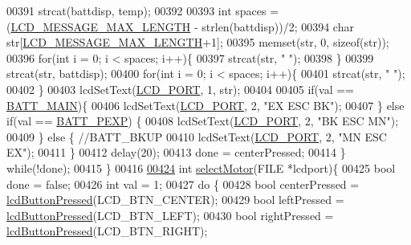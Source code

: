 \begin{DoxyCode}
{{00391         strcat(battdisp, temp);
00392 
00393         \textcolor{keywordtype}{int} spaces = (\hyperlink{lcdmsg_8h_abe4c4b70fc6f44ae3680e5b2c68cdd00}{LCD\_MESSAGE\_MAX\_LENGTH} - strlen(battdisp))/2;
00394         \textcolor{keywordtype}{char} str[\hyperlink{lcdmsg_8h_abe4c4b70fc6f44ae3680e5b2c68cdd00}{LCD\_MESSAGE\_MAX\_LENGTH}+1];
00395         memset(str, 0, \textcolor{keyword}{sizeof}(str));
00396         \textcolor{keywordflow}{for}(\textcolor{keywordtype}{int} i = 0; i < spaces; i++)\{
00397             strcat(str, \textcolor{stringliteral}{" "});
00398         \}
00399         strcat(str, battdisp);
00400         \textcolor{keywordflow}{for}(\textcolor{keywordtype}{int} i = 0; i < spaces; i++)\{
00401             strcat(str, \textcolor{stringliteral}{" "});
00402         \}
00403         lcdSetText(\hyperlink{lcdmsg_8h_abcf42bd88b3c36193f301ca25b033875}{LCD\_PORT}, 1, str);
00404 
00405         \textcolor{keywordflow}{if}(val == \hyperlink{sensors_8h_aa48831e4de90908c1b37560e7aba2c5f}{BATT\_MAIN})\{
00406             lcdSetText(\hyperlink{lcdmsg_8h_abcf42bd88b3c36193f301ca25b033875}{LCD\_PORT}, 2, \textcolor{stringliteral}{"EX     ESC    BK"});
00407         \} \textcolor{keywordflow}{else} \textcolor{keywordflow}{if}(val == \hyperlink{sensors_8h_aaad063d8cfbd393cdc04bcaae68b48ef}{BATT\_PEXP}) \{
00408             lcdSetText(\hyperlink{lcdmsg_8h_abcf42bd88b3c36193f301ca25b033875}{LCD\_PORT}, 2, \textcolor{stringliteral}{"BK     ESC    MN"});
00409         \} \textcolor{keywordflow}{else} \{ \textcolor{comment}{//BATT\_BKUP}
00410             lcdSetText(\hyperlink{lcdmsg_8h_abcf42bd88b3c36193f301ca25b033875}{LCD\_PORT}, 2, \textcolor{stringliteral}{"MN     ESC    EX"});
00411         \}
00412         delay(20);
00413         done = centerPressed;
00414     \} \textcolor{keywordflow}{while}(!done);
00415 \}
00416 
\hypertarget{lcddiag_8c_source.tex_l00424}{}\hyperlink{lcddiag_8c_ae7425e4ec1454bd0054bd4e1db7ea686}{00424} \textcolor{keywordtype}{int} \hyperlink{lcddiag_8c_ae7425e4ec1454bd0054bd4e1db7ea686}{selectMotor}(FILE *lcdport)\{
00425     \textcolor{keywordtype}{bool} done = \textcolor{keyword}{false};
00426     \textcolor{keywordtype}{int} val = 1;
00427     \textcolor{keywordflow}{do} \{
00428         \textcolor{keywordtype}{bool} centerPressed = \hyperlink{lcddiag_8h_a74e4c744db49f9b7b645095575e152ad}{lcdButtonPressed}(LCD\_BTN\_CENTER);
00429         \textcolor{keywordtype}{bool} leftPressed = \hyperlink{lcddiag_8h_a74e4c744db49f9b7b645095575e152ad}{lcdButtonPressed}(LCD\_BTN\_LEFT);
00430         \textcolor{keywordtype}{bool} rightPressed = \hyperlink{lcddiag_8h_a74e4c744db49f9b7b645095575e152ad}{lcdButtonPressed}(LCD\_BTN\_RIGHT);
}}
\end{DoxyCode}
